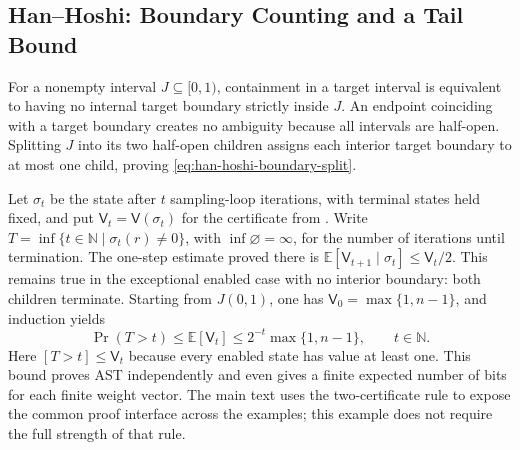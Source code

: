 \subsection{Han--Hoshi: Boundary Counting and a Tail Bound}
\label{app:han-hoshi-tail}
For a nonempty interval $J\subseteq[0,1)$, containment in a target
interval is equivalent to having no internal target boundary strictly
inside $J$. An endpoint coinciding with a target boundary creates no
ambiguity because all intervals are half-open. Splitting $J$ into its
two half-open children assigns each interior target boundary to at most
one child, proving \eqref{eq:han-hoshi-boundary-split}.

Let $\sigma_t$ be the state after $t$ sampling-loop iterations, with
terminal states held fixed, and put $\mathsf V_t=\mathsf V(\sigma_t)$
for the certificate from . Write
$T=\inf\{t\in\mathbb N\mid\sigma_t(r)\ne0\}$, with
$\inf\varnothing=\infty$, for the number of iterations until termination.
The one-step estimate proved there is
$\mathbb E[\mathsf V_{t+1}\mid\sigma_t]\leq\mathsf V_t/2$.
This remains true in the exceptional enabled
case with no interior boundary: both children terminate. Starting from
$J(0,1)$, one has $\mathsf V_0=\max\{1,n-1\}$, and induction yields
\[
 \Pr(T>t)\leq\mathbb E[\mathsf V_t]
 \leq 2^{-t}\max\{1,n-1\},\qquad t\in\mathbb N.
\]
Here $[T>t]\leq\mathsf V_t$ because every enabled state has value at least
one. This bound proves AST independently and even gives a finite
expected number of bits for each finite weight vector. The main text
uses the two-certificate rule to expose the common proof interface
across the examples; this example does not require the full strength
of that rule.
